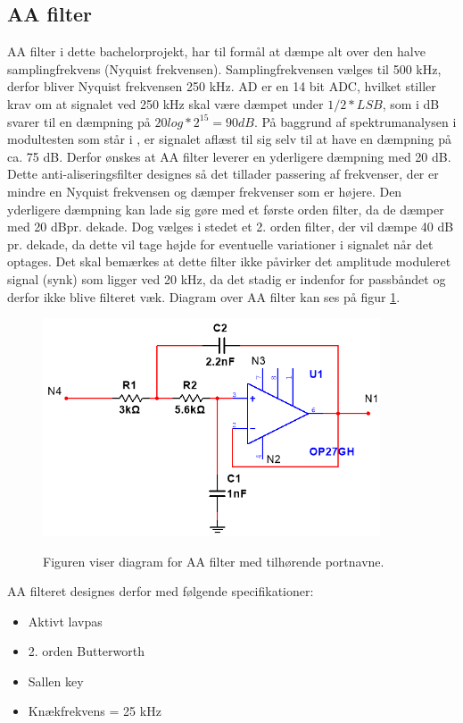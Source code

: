 \subsection{AA filter}

AA filter i dette bachelorprojekt, har til formål at dæmpe alt over den halve samplingfrekvens (Nyquist frekvensen). Samplingfrekvensen vælges til 500 kHz, derfor bliver Nyquist frekvensen 250 kHz. AD er en 14 bit ADC, hvilket stiller krav om at signalet ved 250 kHz skal være dæmpet under $1/2*LSB$, som i dB svarer til en dæmpning på $20log*2^{15}=90dB$. På baggrund af spektrumanalysen i modultesten som står i , er signalet aflæst til sig selv til at have en dæmpning på ca. 75 dB. Derfor ønskes at AA filter leverer en yderligere dæmpning med 20 dB. Dette anti-aliseringsfilter designes så det tillader passering af frekvenser, der er mindre en Nyquist frekvensen og dæmper frekvenser som er højere. Den yderligere dæmpning kan lade sig gøre med et første orden filter, da de dæmper med 20 dBpr. dekade. Dog vælges i stedet et 2. orden filter, der vil dæmpe 40 dB pr. dekade, da dette vil tage højde for eventuelle variationer i signalet når det optages. Det skal bemærkes at dette filter ikke påvirker det amplitude moduleret signal (synk) som ligger ved 20 kHz, da det stadig er indenfor for passbåndet og derfor ikke blive filteret væk. Diagram over AA filter kan ses på figur \ref{fig:aafilterdiagram}.

\begin{figure}[H]
\centering
{\includegraphics[width=10cm]
{Figure/aafilterdiagram}}
\caption{Figuren viser diagram for AA filter med tilhørende portnavne.}
\label{fig:aafilterdiagram}
\end{figure}


AA filteret designes derfor med følgende specifikationer:
\begin{itemize}
\item Aktivt lavpas
\item 2. orden Butterworth
\item Sallen key
\item Knækfrekvens = 25 kHz
\end{itemize}

